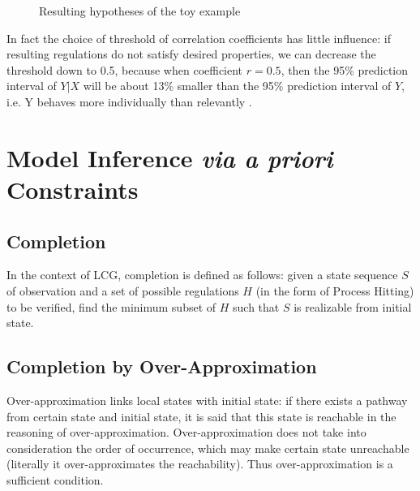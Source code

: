\begin{figure}[ht]
\centering
{}
\caption{Resulting hypotheses of the toy example}\label{ResultBRN}
\end{figure}
In fact the choice of threshold of correlation coefficients has little influence: if resulting regulations do not satisfy desired properties, we can decrease the threshold down to 0.5, because when coefficient $r =0.5$, then the 95\% prediction interval of $Y|X$ will be about 13\% smaller than the 95\% prediction interval of $Y$, i.e. Y behaves more individually than relevantly \cite{hull1927correlation}.
\section{Model Inference \textit{via a priori} Constraints}
\subsection{Completion}
In the context of LCG, completion is defined as follows: given a state sequence $S$ of observation and a set of possible regulations $H$ (in the form of Process Hitting) to be verified,  find the minimum subset of $H$ such that $S$ is realizable from initial state. 
\subsection{Completion by Over-Approximation}
Over-approximation links local states with initial state: if there exists a pathway from certain state and initial state, it is said that this state is reachable in the reasoning of over-approximation. Over-approximation does not take into consideration the order of occurrence, which may make certain state unreachable (literally it over-approximates the reachability). Thus over-approximation is a sufficient condition.

